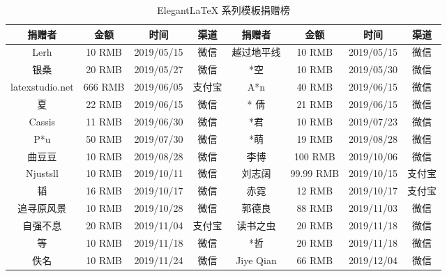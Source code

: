 \documentclass[cn,geye,blue,14pt,normal]{elegantnote}
\begin{document}
\begin{table}[htbp]
  \scriptsize
  \centering
  \caption{Elegant\LaTeX{} 系列模板捐赠榜}
  \begin{tabular}{*{8}{>{\scriptsize}c}}
    \toprule
    \textbf{捐赠者} & \textbf{金额} & \textbf{时间} & \textbf{渠道} & \textbf{捐赠者} & \textbf{金额} & \textbf{时间} & \textbf{渠道} \\
    \midrule
    Lerh            & 10 RMB        & 2019/05/15    & 微信          & 越过地平线      & 10 RMB        & 2019/05/15    & 微信          \\
    银桑            & 20 RMB        & 2019/05/27    & 微信          & *空             & 10 RMB        & 2019/05/30    & 微信          \\
    latexstudio.net & 666 RMB       & 2019/06/05    & 支付宝        & A*n             & 40 RMB        & 2019/06/15    & 微信          \\
    * 夏            & 22 RMB        & 2019/06/15    & 微信          & * 倩            & 21 RMB        & 2019/06/15    & 微信          \\
    Cassis          & 11 RMB        & 2019/06/30    & 微信          & *君             & 10 RMB        & 2019/07/23    & 微信          \\
    P*u             & 50 RMB        & 2019/07/30    & 微信          & *萌             & 19 RMB        & 2019/08/28    & 微信          \\
    曲豆豆          & 10 RMB        & 2019/08/28    & 微信          & 李博            & 100 RMB       & 2019/10/06    & 微信          \\
    Njustsll        & 10 RMB        & 2019/10/11    & 微信          & 刘志阔          & 99.99 RMB     & 2019/10/15    & 支付宝        \\
    * 韬            & 16 RMB        & 2019/10/17    & 微信          & 赤霓            & 12 RMB        & 2019/10/17    & 支付宝        \\
    追寻原风景      & 10 RMB        & 2019/10/28    & 微信          & 郭德良          & 88 RMB        & 2019/11/03    & 微信          \\
    自强不息        & 20 RMB        & 2019/11/04    & 支付宝        & 读书之虫        & 20 RMB        & 2019/11/18    & 微信          \\
    *等             & 10 RMB        & 2019/11/18    & 微信          & *哲             & 20 RMB        & 2019/11/18    & 微信          \\
    佚名            & 10 RMB        & 2019/11/24    & 微信          & Jiye Qian       & 66 RMB        & 2019/12/04    & 微信          \\

\end{tabular}
\end{table}
\end{document}
